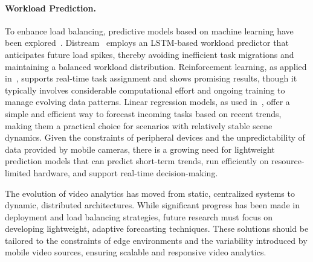 \paragraph{Workload Prediction.}
To enhance load balancing, predictive models based on machine learning have been explored~\cite{zeng2020distream,yuan2021online,kombi2017preventive}.
Distream~\cite{zeng2020distream} employs an LSTM-based workload predictor that anticipates future load spikes, thereby avoiding inefficient task migrations and maintaining a balanced workload distribution.
Reinforcement learning, as applied in~\cite{yuan2021online}, supports real-time task assignment and shows promising results, though it typically involves considerable computational effort and ongoing training to manage evolving data patterns.
Linear regression models, as used in~\cite{kombi2017preventive}, offer a simple and efficient way to forecast incoming tasks based on recent trends, making them a practical choice for scenarios with relatively stable scene dynamics.
Given the constraints of peripheral devices and the unpredictability of data provided by mobile cameras, there is a growing need for lightweight prediction models that can predict short-term trends, run efficiently on resource-limited hardware, and support real-time decision-making.

The evolution of video analytics has moved from static, centralized systems to dynamic, distributed architectures. While significant progress has been made in deployment and load balancing strategies, future research must focus on developing lightweight, adaptive forecasting techniques. These solutions should be tailored to the constraints of edge environments and the variability introduced by mobile video sources, ensuring scalable and responsive video analytics.




